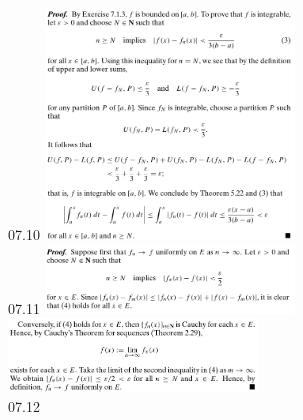 \documentclass[8pt,landscape]{article}
\begin{document}
\begin{multicols}{3}
    07.10
    \includegraphics[width=250]{07_10.png} \\
    07.11
    \includegraphics[width=250]{07_11a.png} \\
    \includegraphics[width=250]{07_11b.png} \\
    07.12

\end{multicols}
\end{document}
